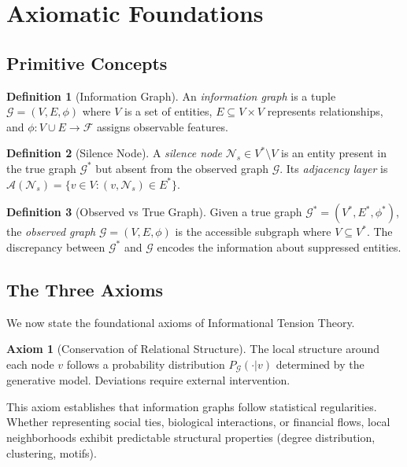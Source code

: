 \documentclass[11pt,a4paper]{article}
\theoremstyle{definition}
\newtheorem{axiom}{Axiom}
\newtheorem{definition}{Definition}[section]
\theoremstyle{remark}
\newcommand{\NS}{\mathcal{N}_s}
\newcommand{\CA}{\mathcal{A}}
\newcommand{\Graph}{\mathcal{G}}
\begin{document}
\section{Axiomatic Foundations}

\subsection{Primitive Concepts}

\begin{definition}[Information Graph]
An \emph{information graph} is a tuple $\Graph = (V, E, \phi)$ where $V$ is a set of entities, $E \subseteq V \times V$ represents relationships, and $\phi: V \cup E \to \mathcal{F}$ assigns observable features.
\end{definition}

\begin{definition}[Silence Node]
A \emph{silence node} $\NS \in V^* \setminus V$ is an entity present in the true graph $\Graph^*$ but absent from the observed graph $\Graph$. Its \emph{adjacency layer} is $\CA(\NS) = \{v \in V : (v, \NS) \in E^*\}$.
\end{definition}

\begin{definition}[Observed vs True Graph]
Given a true graph $\Graph^* = (V^*, E^*, \phi^*)$, the \emph{observed graph} $\Graph = (V, E, \phi)$ is the accessible subgraph where $V \subseteq V^*$. The discrepancy between $\Graph^*$ and $\Graph$ encodes the information about suppressed entities.
\end{definition}

\subsection{The Three Axioms}

We now state the foundational axioms of Informational Tension Theory.

\begin{axiom}[Conservation of Relational Structure]
\label{ax:conservation}
The local structure around each node $v$ follows a probability distribution $P_{\Graph}(\cdot | v)$ determined by the generative model. Deviations require external intervention.
\end{axiom}

This axiom establishes that information graphs follow statistical regularities. Whether representing social ties, biological interactions, or financial flows, local neighborhoods exhibit predictable structural properties (degree distribution, clustering, motifs).
\end{document}
